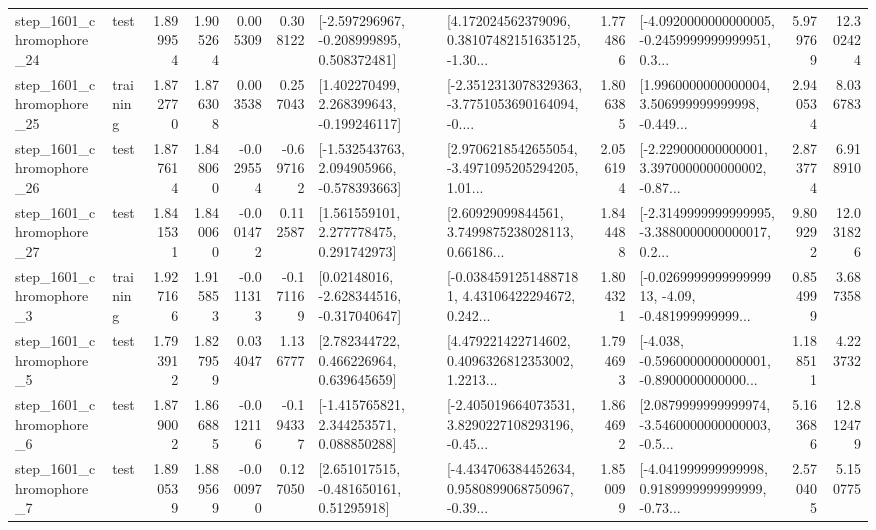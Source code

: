 \begin{tabular}{llrrrrllrlrr}
 step\_1601\_chromophore\_24 &      test &      1.899954 &    1.905264 &      0.005309 &  0.308122 &   [-2.597296967, -0.208999895, 0.508372481] &  [4.172024562379096, 0.38107482151635125, -1.30... &       1.774866 &  [-4.0920000000000005, -0.2459999999999951, 0.3... &            5.979769 &         12.302424 \\
 step\_1601\_chromophore\_25 &  training &      1.872770 &    1.876308 &      0.003538 &  0.257043 &    [1.402270499, 2.268399643, -0.199246117] &  [-2.3512313078329363, -3.7751053690164094, -0.... &       1.806385 &  [1.9960000000000004, 3.506999999999998, -0.449... &            2.940534 &          8.036783 \\
 step\_1601\_chromophore\_26 &      test &      1.877614 &    1.848060 &     -0.029554 & -0.697162 &   [-1.532543763, 2.094905966, -0.578393663] &  [2.9706218542655054, -3.4971095205294205, 1.01... &       2.056194 &  [-2.229000000000001, 3.3970000000000002, -0.87... &            2.873774 &          6.918910 \\
 step\_1601\_chromophore\_27 &      test &      1.841531 &    1.840060 &     -0.001472 &  0.112587 &     [1.561559101, 2.277778475, 0.291742973] &  [2.60929099844561, 3.7499875238028113, 0.66186... &       1.844488 &  [-2.3149999999999995, -3.3880000000000017, 0.2... &            9.809292 &         12.031826 \\
  step\_1601\_chromophore\_3 &  training &      1.927166 &    1.915853 &     -0.011313 & -0.171169 &    [0.02148016, -2.628344516, -0.317040647] &  [-0.03845912514887181, 4.43106422294672, 0.242... &       1.804321 &  [-0.026999999999999913, -4.09, -0.481999999999... &            0.854999 &          3.687358 \\
  step\_1601\_chromophore\_5 &      test &      1.793912 &    1.827959 &      0.034047 &  1.136777 &     [2.782344722, 0.466226964, 0.639645659] &  [4.479221422714602, 0.4096326812353002, 1.2213... &       1.794693 &  [-4.038, -0.5960000000000001, -0.8900000000000... &            1.188511 &          4.223732 \\
  step\_1601\_chromophore\_6 &      test &      1.879002 &    1.866885 &     -0.012116 & -0.194337 &    [-1.415765821, 2.344253571, 0.088850288] &  [-2.405019664073531, 3.8290227108293196, -0.45... &       1.864692 &  [2.0879999999999974, -3.5460000000000003, -0.5... &            5.163686 &         12.812479 \\
  step\_1601\_chromophore\_7 &      test &      1.890539 &    1.889569 &     -0.000970 &  0.127050 &     [2.651017515, -0.481650161, 0.51295918] &  [-4.434706384452634, 0.9580899068750967, -0.39... &       1.850099 &  [-4.041999999999998, 0.9189999999999999, -0.73... &            2.570405 &          5.150775 \\

\end{tabular}
